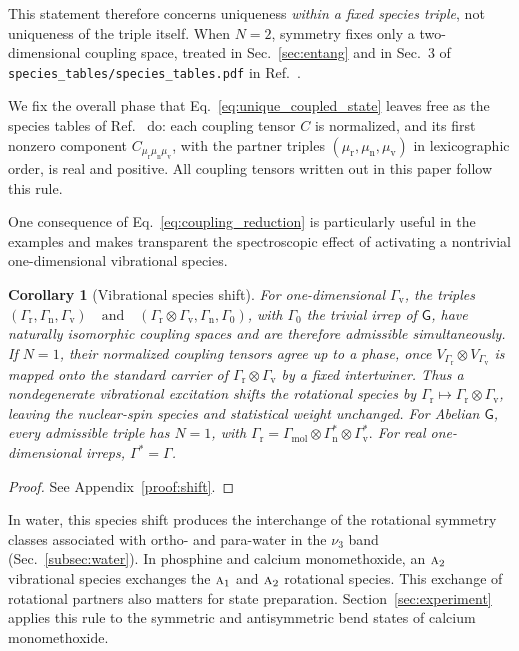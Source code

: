 \documentclass[
  reprint,
  aps,
  prx,
  superscriptaddress,
  amsmath,
  amssymb,
  longbibliography
]{revtex4-2}
\newcommand{\grp}[1]{\mathsf{#1}}
\newcommand{\irr}[1]{\text{\normalfont\scshape #1}}
\newtheorem{corollary}{Corollary}
\providecommand{\Gmol}{\Gamma_{\mathrm{mol}}}
\providecommand{\Grot}{\Gamma_{\mathrm{r}}}
\providecommand{\Gvib}{\Gamma_{\mathrm{v}}}
\providecommand{\Gspin}{\Gamma_{\mathrm{n}}}
\begin{document}
This statement therefore concerns uniqueness \emph{within a fixed species triple}, not uniqueness of the triple itself. When $N=2$, symmetry fixes only a two-dimensional coupling space, treated in Sec.~\ref{sec:entang} and in Sec.~3 of \texttt{species\_tables/species\_tables.pdf} in Ref.~\cite{DasRepo2026}.

We fix the overall phase that Eq.~\eqref{eq:unique_coupled_state} leaves free as the species tables of Ref.~\cite{DasRepo2026} do: each coupling tensor \(C\) is normalized, and its first nonzero component \(C_{\mu_{\mathrm r}\mu_{\mathrm n}\mu_{\mathrm v}}\), with the partner triples \((\mu_{\mathrm r},\mu_{\mathrm n},\mu_{\mathrm v})\) in lexicographic order, is real and positive. All coupling tensors written out in this paper follow this rule.

One consequence of Eq.~\eqref{eq:coupling_reduction} is particularly useful in the examples and makes transparent the spectroscopic effect of activating a nontrivial one-dimensional vibrational species.

\begin{corollary}[Vibrational species shift]
\label{cor:shift}
For one-dimensional \(\Gvib\), the triples
\(
(\Grot,\Gspin,\Gvib)
\quad\text{and}\quad
(\Grot\otimes\Gvib,\Gspin,\Gamma_0)
\),
with \(\Gamma_0\) the trivial irrep of \(\grp{G}\), have naturally isomorphic coupling spaces and are therefore admissible simultaneously. If \(N=1\), their normalized coupling tensors agree up to a phase, once $V_{\Grot}\otimes V_{\Gvib}$ is mapped onto the standard carrier of $\Grot\otimes\Gvib$ by a fixed intertwiner. Thus a nondegenerate vibrational excitation shifts the rotational species by \(\Grot\mapsto\Grot\otimes\Gvib\), leaving the nuclear-spin species and statistical weight unchanged. For Abelian \(\grp{G}\), every admissible triple has \(N=1\), with 
$\Grot
=\Gmol\otimes\Gspin^{*}\otimes\Gvib^{*}.$
For real one-dimensional irreps, \(\Gamma^{*}=\Gamma\).
\end{corollary}
\begin{proof}
See Appendix~\ref{proof:shift}.
\end{proof}
In water, this species shift produces the interchange of the rotational symmetry classes associated with ortho- and para-water in the \(\nu_3\) band (Sec.~\ref{subsec:water}). In phosphine and calcium monomethoxide, an \(\irr{a}_{2}\) vibrational species exchanges the \(\irr{a}_{1}\) and \(\irr{a}_{2}\) rotational species. This exchange of rotational partners also matters for state preparation. Section~\ref{sec:experiment} applies this rule to the symmetric and antisymmetric bend states of calcium monomethoxide.
\end{document}
